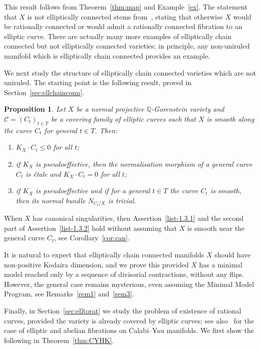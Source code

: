 \documentclass[11pt]{article}
\newtheorem{prop}[theo]{Proposition}
\theoremstyle{definition}
\numberwithin{equation}{section}
\numberwithin{figure}{section}
\numberwithin{table}{section}
\newcommand{\Qbb}{\mathbb{Q}} %
\newcommand\sC{\mathcal{C}}
\newcommand*{\romanenumi}{\renewcommand*{\theenumi}{\roman{enumi}}}
\begin{document}
This result follows from Theorem~\ref{thm:map} and Example~\ref{ex}. The statement that $X$ is not elliptically connected stems from~\cite[Theorem~6.2]{Gou16}, stating that otherwise $X$ would be rationally connected or would admit a rationally connected fibration to an elliptic curve. There are actually many more examples of elliptically chain connected but not elliptically connected varieties; in principle, any non-uniruled manifold which is elliptically chain connected provides an example.

We next study the structure of elliptically chain connected varieties which are not uniruled. The starting point is the following result, proved in Section~\ref{sec:ellchainconn}.

\begin{prop}\label{prop:1.3}
Let $X$ be a normal projective $\Qbb$-Gorenstein variety and $\sC = (C_t)_{t\in T} $ be a covering family of elliptic curves such that $X$ is smooth along the curve $C_t$ for general $t\in T$. Then:
\begin{enumerate}\romanenumi
\item \label{list-1.3.1}$K_X \cdot C_t \leq 0$ for all $t$;
\item \label{list-1.3.2}if $K_X$ is pseudoeffective, then the normalisation morphism of a general curve $C_t$ is étale and $K_X \cdot C_t = 0$ for all $t$;
\item \label{list-1.3.3}if $K_X$ is pseudoeffective and if for a general $t\in T$ the curve $C_t$ is smooth, then its normal bundle $N_{C_t/X}$ is trivial.
\end{enumerate}
\end{prop}

When $X$ has canonical singularities, then Assertion~\eqref{list-1.3.1} and the second part of Assertion~\eqref{list-1.3.2} hold without assuming that $X$ is smooth near the general curve $C_t$, see Corollary~\ref{cor:can}.

It is natural to expect that elliptically chain connected manifolds $X$ should have non-positive Kodaira dimension, and we prove this provided $X$ has a minimal model reached only by a sequence of divisorial contractions, without any flips. However, the general case remains mysterious, even assuming the Minimal Model Program, see Remarks~\ref{rem1} and~\ref{rem3}.


Finally, in Section~\ref{sec:elltorat} we study the problem of existence of rational curves, provided the variety is already covered by elliptic curves; see also~\cite{DFM16} for the case of elliptic and abelian fibrations on Calabi--Yau manifolds. We first show the following in Theorem~\ref{thm:CYHK}.
\end{document}
